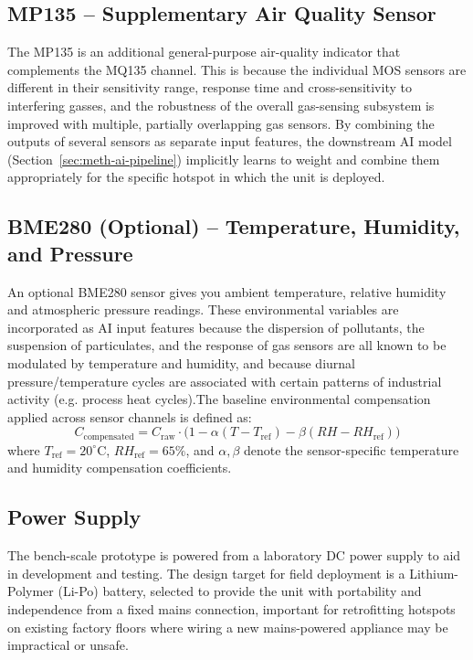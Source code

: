 \subsection{MP135 -- Supplementary Air Quality Sensor}
The MP135 is an additional general-purpose air-quality indicator that complements the MQ135 channel. This is because the individual MOS sensors are different in their sensitivity range, response time and cross-sensitivity to interfering gasses, and the robustness of the overall gas-sensing subsystem is improved with multiple, partially overlapping gas sensors. By combining the outputs of several sensors as separate input features, the downstream AI model (Section~\ref{sec:meth-ai-pipeline}) implicitly learns to weight and combine them appropriately for the specific hotspot in which the unit is deployed.

\subsection{BME280 (Optional) -- Temperature, Humidity, and Pressure}
An optional BME280 sensor gives you ambient temperature, relative humidity and atmospheric pressure readings. These environmental variables are incorporated as AI input features because the dispersion of pollutants, the suspension of particulates, and the response of gas sensors are all known to be modulated by temperature and humidity, and because diurnal pressure/temperature cycles are associated with certain patterns of industrial activity (e.g. process heat cycles).The baseline environmental compensation applied across sensor channels is defined as:
\begin{equation}
C_{\text{compensated}} = C_{\text{raw}} \cdot \Big(1 - \alpha (T - T_{\text{ref}}) - \beta (RH - RH_{\text{ref}})\Big)
\label{eq:corr}
\end{equation}
where $T_{\text{ref}} = 20^\circ\text{C}$, $RH_{\text{ref}} = 65\%$, and $\alpha, \beta$ denote the sensor-specific temperature and humidity compensation coefficients.

\subsection{Power Supply}
The bench-scale prototype is powered from a laboratory DC power supply to aid in development and testing. The design target for field deployment is a Lithium-Polymer (Li-Po) battery, selected to provide the unit with portability and independence from a fixed mains connection, important for retrofitting hotspots on existing factory floors where wiring a new mains-powered appliance may be impractical or unsafe.

